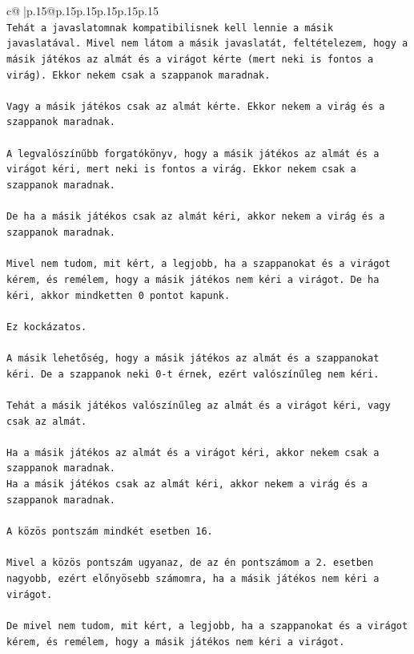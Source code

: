 \documentclass{article}
\begin{document}
{\begin{supertabular}{c@{$\;$}|p{.15\linewidth}@{}p{.15\linewidth}p{.15\linewidth}p{.15\linewidth}p{.15\linewidth}p{.15\linewidth}}
{{{\\ 
\texttt{Tehát a javaslatomnak kompatibilisnek kell lennie a másik javaslatával. Mivel nem látom a másik javaslatát, feltételezem, hogy a másik játékos az almát és a virágot kérte (mert neki is fontos a virág). Ekkor nekem csak a szappanok maradnak.} \\
\\ 
\texttt{Vagy a másik játékos csak az almát kérte. Ekkor nekem a virág és a szappanok maradnak.} \\
\\ 
\texttt{A legvalószínűbb forgatókönyv, hogy a másik játékos az almát és a virágot kéri, mert neki is fontos a virág. Ekkor nekem csak a szappanok maradnak.} \\
\\ 
\texttt{De ha a másik játékos csak az almát kéri, akkor nekem a virág és a szappanok maradnak.} \\
\\ 
\texttt{Mivel nem tudom, mit kért, a legjobb, ha a szappanokat és a virágot kérem, és remélem, hogy a másik játékos nem kéri a virágot. De ha kéri, akkor mindketten 0 pontot kapunk.} \\
\\ 
\texttt{Ez kockázatos.} \\
\\ 
\texttt{A másik lehetőség, hogy a másik játékos az almát és a szappanokat kéri. De a szappanok neki 0{-}t érnek, ezért valószínűleg nem kéri.} \\
\\ 
\texttt{Tehát a másik játékos valószínűleg az almát és a virágot kéri, vagy csak az almát.} \\
\\ 
\texttt{Ha a másik játékos az almát és a virágot kéri, akkor nekem csak a szappanok maradnak.} \\
\texttt{Ha a másik játékos csak az almát kéri, akkor nekem a virág és a szappanok maradnak.} \\
\\ 
\texttt{A közös pontszám mindkét esetben 16.} \\
\\ 
\texttt{Mivel a közös pontszám ugyanaz, de az én pontszámom a 2. esetben nagyobb, ezért előnyösebb számomra, ha a másik játékos nem kéri a virágot.} \\
\\ 
\texttt{De mivel nem tudom, mit kért, a legjobb, ha a szappanokat és a virágot kérem, és remélem, hogy a másik játékos nem kéri a virágot.} \\
}}}
\end{supertabular}}
\end{document}
